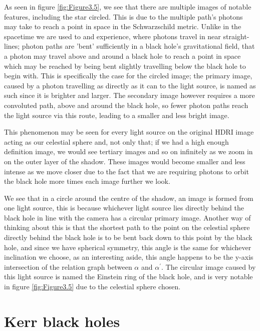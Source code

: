 \documentclass[oneside,openright,frontopenright, singlespacing]{dmathesis}
\begin{document}
\vspace{1em}
	As seen in figure \ref{fig:Figure3.5}, we see that there are multiple images of notable features, including the star circled. This is due to the multiple path's photons may take to reach a point in space in the Schwarzschild metric. Unlike in the spacetime we are used to and experience, where photons travel in near straight-lines; photon paths are 'bent' sufficiently in a black hole's gravitational field, that a photon may travel above and around a black hole to reach a point in space which may be reached by being bent slightly travelling below the black hole to begin with. This is specifically the case for the circled image; the primary image, caused by a photon travelling as directly as it can to the light source, is named as such since it is brighter and larger. The secondary image however requires a more convoluted path, above and around the black hole, so fewer photon paths reach the light source via this route, leading to a smaller and less bright image.

\vspace{1em}
	This phenomenon may be seen for every light source on the original HDRI image acting as our celestial sphere and, not only that; if we had a high enough definition image, we would see tertiary images and so on infinitely as we zoom in on the outer layer of the shadow. These images would become smaller and less intense as we move closer due to the fact that we are requiring photons to orbit the black hole more times each image further we look.

\vspace{1em}
	We see that in a circle around the centre of the shadow, an image is formed from one light source, this is because whichever light source lies directly behind the black hole in line with the camera has a circular primary image. Another way of thinking about this is that the shortest path to the point on the celestial sphere directly behind the black hole is to be bent back down to this point by the black hole, and since we have spherical symmetry, this angle is the same for whichever inclination we choose, as an interesting aside, this angle happens to be the y-axis intersection of the relation graph between $\alpha$ and $\alpha^{'}$. The circular image caused by this light source is named the Einstein ring of the black hole, and is very notable in figure \ref{fig:Figure3.5} due to the celestial sphere chosen.




\chapter{Kerr black holes}\label{chap:Chapter4}
\end{document}
